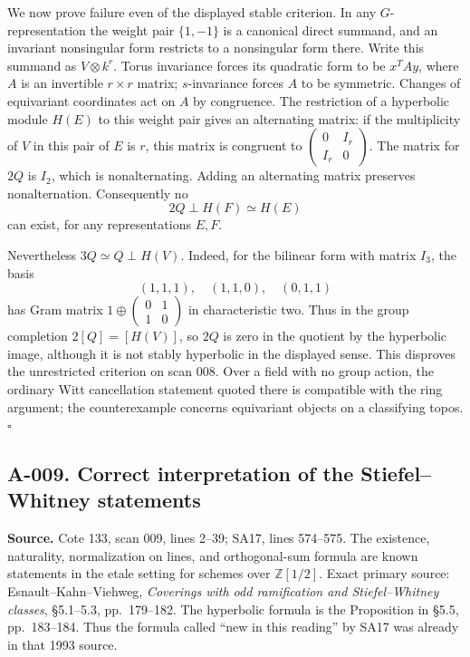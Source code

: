 We now prove failure even of the displayed stable criterion.  In any
$G$-representation the weight pair $\{1,-1\}$ is a canonical direct
summand, and an invariant nonsingular form restricts to a nonsingular
form there.  Write this summand as $V\otimes k^r$.  Torus invariance
forces its quadratic form to be $x^TAy$, where $A$ is an invertible
$r\times r$ matrix; $s$-invariance forces $A$ to be symmetric.  Changes
of equivariant coordinates act on $A$ by congruence.  The restriction
of a hyperbolic module $H(E)$ to this weight pair gives an alternating
matrix: if the multiplicity of $V$ in this pair of $E$ is $r$, this
matrix is congruent to
$\left(\begin{smallmatrix}0&I_r\\I_r&0\end{smallmatrix}\right)$.
The matrix for $2Q$ is $I_2$, which is nonalternating.  Adding an
alternating matrix preserves nonalternation.  Consequently no
\[
 2Q\perp H(F)\simeq H(E)
\]
can exist, for any representations $E,F$.

Nevertheless $3Q\simeq Q\perp H(V)$.  Indeed, for the bilinear form
with matrix $I_3$, the basis
\[
 (1,1,1),\quad(1,1,0),\quad(0,1,1)
\]
has Gram matrix $1\oplus
\left(\begin{smallmatrix}0&1\\1&0\end{smallmatrix}\right)$ in
characteristic two.  Thus in the group completion
$2[Q]=[H(V)]$, so $2Q$ is zero in the quotient by the hyperbolic image,
although it is not stably hyperbolic in the displayed sense.
This disproves the unrestricted criterion on scan 008.  Over a field
with no group action, the ordinary Witt cancellation statement quoted
there is compatible with the ring argument; the counterexample concerns
equivariant objects on a classifying topos. \hfill$\square$

\subsection*{A-009. Correct interpretation of the Stiefel--Whitney statements}
\textbf{Source.} Cote 133, scan 009, lines 2--39; SA17, lines 574--575.
The existence, naturality, normalization on lines, and orthogonal-sum
formula are known statements in the etale setting for schemes over
$\mathbb Z[1/2]$. Exact primary source: Esnault--Kahn--Viehweg,
\emph{Coverings with odd ramification and Stiefel--Whitney classes},
\S5.1--5.3, pp.~179--182. The hyperbolic formula is the Proposition in
\S5.5, pp.~183--184. Thus the formula called ``new in this reading''
by SA17 was already in that 1993 source.

